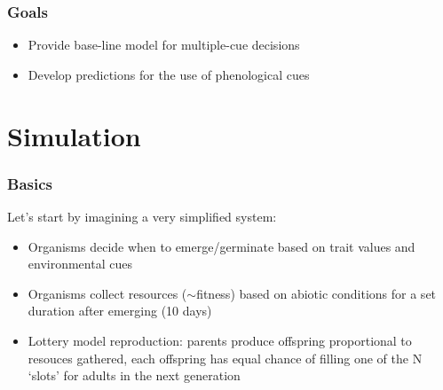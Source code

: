 \documentclass[pdf]{beamer}
\begin{document}
\begin{frame}
\frametitle{Goals}
\begin{itemize}
 \item Provide base-line model for multiple-cue decisions
 \item Develop predictions for the use of phenological cues
\end{itemize}
\end{frame}


\section{Simulation}
\begin{frame}
\frametitle{Basics}
Let's start by imagining a very simplified system:
\begin{itemize}
 \item Organisms decide when to emerge/germinate based on trait values and environmental cues \pause
 \item Organisms collect resources ($\sim$fitness) based on abiotic conditions for a set duration after emerging (10 days) \pause
 \item Lottery model reproduction: parents produce offspring proportional to resouces gathered, each offspring has equal chance of filling one of the N `slots' for adults in the next generation
\end{itemize}
\end{frame}
\end{document}
